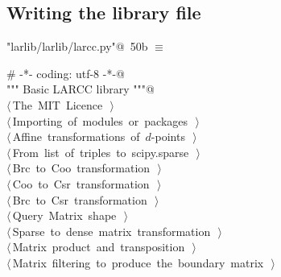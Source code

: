 \documentclass[11pt,oneside]{article}	%
\begin{document}
\subsection{Writing the library file}

\begin{flushleft} \small \label{scrap82}
\protect{}\verb@"larlib/larlib/larcc.py"@\nobreak\ {\footnotesize 50b }$\equiv$
\vspace{-1ex}
\begin{list}{}{} \item
\mbox{}\verb@# -*- coding: utf-8 -*-@\\
\mbox{}\verb@""" Basic LARCC library """@\\
\mbox{}\verb@@\hbox{$\langle\,$The MIT Licence\nobreak\ {\footnotesize {}}$\,\rangle$}\verb@@\\
\mbox{}\verb@@\hbox{$\langle\,$Importing of modules or packages\nobreak\ {\footnotesize {}}$\,\rangle$}\verb@@\\
\mbox{}\verb@@\hbox{$\langle\,$Affine transformations of $d$-points\nobreak\ {\footnotesize {}}$\,\rangle$}\verb@@\\
\mbox{}\verb@@\hbox{$\langle\,$From list of triples to scipy.sparse\nobreak\ {\footnotesize {}}$\,\rangle$}\verb@@\\
\mbox{}\verb@@\hbox{$\langle\,$Brc to Coo transformation\nobreak\ {\footnotesize {}}$\,\rangle$}\verb@@\\
\mbox{}\verb@@\hbox{$\langle\,$Coo to Csr transformation\nobreak\ {\footnotesize {}}$\,\rangle$}\verb@@\\
\mbox{}\verb@@\hbox{$\langle\,$Brc to Csr transformation\nobreak\ {\footnotesize {}}$\,\rangle$}\verb@@\\
\mbox{}\verb@@\hbox{$\langle\,$Query Matrix shape\nobreak\ {\footnotesize {}}$\,\rangle$}\verb@@\\
\mbox{}\verb@@\hbox{$\langle\,$Sparse to dense matrix transformation\nobreak\ {\footnotesize {}}$\,\rangle$}\verb@@\\
\mbox{}\verb@@\hbox{$\langle\,$Matrix product and transposition\nobreak\ {\footnotesize {}}$\,\rangle$}\verb@@\\
\mbox{}\verb@@\hbox{$\langle\,$Matrix filtering to produce the boundary matrix\nobreak\ {\footnotesize {}}$\,\rangle$}\verb@@\\

\end{list}
\end{flushleft}
\end{document}
